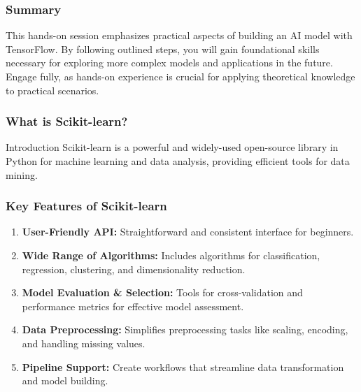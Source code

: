 \documentclass[aspectratio=169]{beamer}
\begin{document}
\begin{frame}[fragile]
    \frametitle{Summary}
    This hands-on session emphasizes practical aspects of building an AI model with TensorFlow. By following outlined steps, you will gain foundational skills necessary for exploring more complex models and applications in the future. Engage fully, as hands-on experience is crucial for applying theoretical knowledge to practical scenarios.
\end{frame}

\begin{frame}
    \frametitle{What is Scikit-learn?}
    \begin{block}{Introduction}
        Scikit-learn is a powerful and widely-used open-source library in Python for machine learning and data analysis, providing efficient tools for data mining.
    \end{block}
\end{frame}

\begin{frame}
    \frametitle{Key Features of Scikit-learn}
    \begin{enumerate}
        \item \textbf{User-Friendly API:} Straightforward and consistent interface for beginners.
        \item \textbf{Wide Range of Algorithms:} Includes algorithms for classification, regression, clustering, and dimensionality reduction.
        \item \textbf{Model Evaluation \& Selection:} Tools for cross-validation and performance metrics for effective model assessment.
        \item \textbf{Data Preprocessing:} Simplifies preprocessing tasks like scaling, encoding, and handling missing values.
        \item \textbf{Pipeline Support:} Create workflows that streamline data transformation and model building.
    \end{enumerate}
\end{frame}
\end{document}
